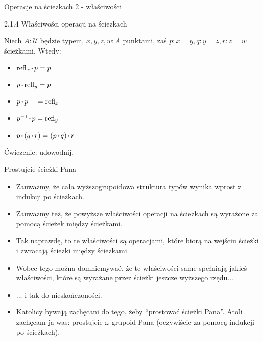 \documentclass{beamer}
\newcommand{\U}{\mathcal{U}}
\newcommand{\refl}[1]{\text{refl}_{#1}}
\newcommand{\inv}[1]{#1^{-1}}
\newcommand{\sq}{\mathbin{\vcenter{\hbox{\rule{.3ex}{.3ex}}}}}
\begin{document}
\begin{frame}{Operacje na ścieżkach 2 - właściwości}

\begin{block}{2.1.4 Właściwości operacji na ścieżkach}

Niech $A : \U$ będzie typem, $x, y, z, w : A$ punktami, zaś $p : x = y, q : y = z, r : z = w$ ścieżkami. Wtedy:

\begin{itemize}
	\item $\refl{x} \sq p = p$
	\item $p \sq \refl{y} = p$
	\item $p \sq \inv{p} = \refl{x}$
	\item $\inv{p} \sq p = \refl{y}$
	\item $p \sq (q \sq r) = (p \sq q) \sq r$
\end{itemize}

\end{block}

Ćwiczenie: udowodnij.

\end{frame}

\begin{frame}{Prostujcie ścieżki Pana}
\begin{itemize}
	\item Zauważmy, że cała wyższogrupoidowa struktura typów wynika wprost z indukcji po ścieżkach.
	\item Zauważmy też, że powyższe właściwości operacji na ścieżkach są wyrażone za pomocą ścieżek między ścieżkami.
	\item Tak naprawdę, to te właściwości są operacjami, które biorą na wejściu ścieżki i zwracają ścieżki między ścieżkami.
	\item Wobec tego można domniemywać, że te właściwości same spełniają jakieś właściwości, które są wyrażane przez ścieżki jeszcze wyższego rzędu...
	\item ... i tak do nieskończoności.
	\item Katolicy bywają zachęcani do tego, żeby ``prostować ścieżki Pana''. Atoli zachęcam ja was: prostujcie $\omega$-grupoid Pana (oczywiście za pomocą indukcji po ścieżkach).
\end{itemize}
\end{frame}
\end{document}
